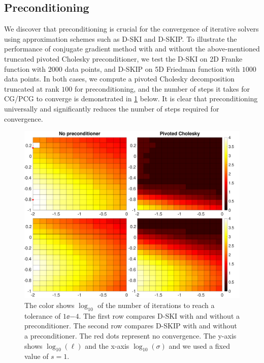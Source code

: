 \subsection{Preconditioning}

We discover that preconditioning is crucial for the convergence of iterative
solvers using  approximation schemes such as D\hyp{}SKI and D\hyp{}SKIP. To
illustrate the performance of conjugate gradient method with and without the
above\hyp{}mentioned truncated pivoted Cholesky preconditioner, we test the
D\hyp{}SKI on 2D Franke function with $2000$ data points, and D\hyp{}SKIP on 5D
Friedman function with $1000$ data points. In both cases, we compute a pivoted
Cholesky decomposition truncated at rank $100$ for preconditioning, and the
number of steps it takes for CG/PCG to converge is demonstrated in 
\cref{fig:precond} below. It is clear that preconditioning universally and
significantly reduces the number of steps required for convergence.

\begin{figure}[ht]
  \begin{center}
    \includegraphics[width=\textwidth]{./sgp/pics/precond}
    \caption{The color shows $\log_{10}$ of the number of iterations to reach a
    tolerance of $1\ee{-4}$. The first row compares D\hyp{}SKI with and without
    a preconditioner. The second row compares D\hyp{}SKIP with and without a
    preconditioner. The red dots represent no convergence. The y\hyp{}axis shows
    $\log_{10}(\ell)$ and the x\hyp{}axis $\log_{10}(\sigma)$ and we used a
    fixed value of $s=1$.}\label{fig:precond}
  \end{center}
\end{figure}

